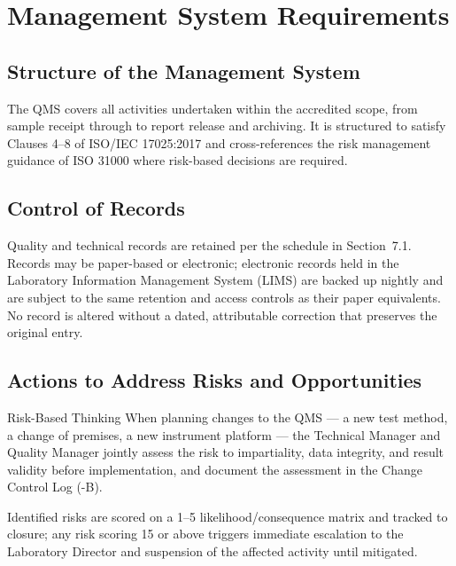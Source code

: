 
\section{Management System Requirements}

\subsection{Structure of the Management System}

The QMS covers all activities undertaken within the accredited scope, from sample receipt
through to report release and archiving. It is structured to satisfy Clauses 4--8 of
ISO/IEC 17025:2017 \cite{iso17025} and cross-references the risk management guidance of
ISO 31000 \cite{iso31000} where risk-based decisions are required.

\subsection{Control of Records}

Quality and technical records are retained per the schedule in Section~7.1. Records may be
paper-based or electronic; electronic records held in the Laboratory Information Management
System (LIMS) are backed up nightly and are subject to the same retention and access
controls as their paper equivalents. No record is altered without a dated, attributable
correction that preserves the original entry.

\subsection{Actions to Address Risks and Opportunities}

\begin{clausebox}{Risk-Based Thinking}
When planning changes to the QMS --- a new test method, a change of premises, a new
instrument platform --- the Technical Manager and Quality Manager jointly assess the risk to
impartiality, data integrity, and result validity before implementation, and document the
assessment in the Change Control Log (\doccode-B).
\end{clausebox}

Identified risks are scored on a 1--5 likelihood/consequence matrix and tracked to closure;
any risk scoring 15 or above triggers immediate escalation to the Laboratory Director and
suspension of the affected activity until mitigated.

